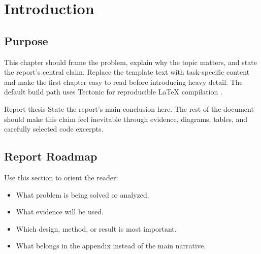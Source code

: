 \chapter{Introduction}

\section{Purpose}

This chapter should frame the problem, explain why the topic matters, and state the report's central claim.
Replace the template text with task-specific content and make the first chapter easy to read before introducing heavy detail.
The default build path uses Tectonic for reproducible LaTeX compilation \citep{tectonic}.

\begin{findingbox}{Report thesis}
State the report's main conclusion here. The rest of the document should make this claim feel inevitable through evidence, diagrams, tables, and carefully selected code excerpts.
\end{findingbox}

\section{Report Roadmap}

Use this section to orient the reader:

\begin{itemize}
  \item What problem is being solved or analyzed.
  \item What evidence will be used.
  \item Which design, method, or result is most important.
  \item What belongs in the appendix instead of the main narrative.
\end{itemize}
